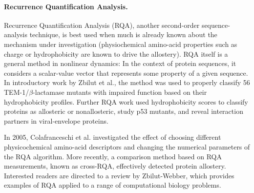 \paragraph{Recurrence Quantification Analysis.} Recurrence Quantification Analysis (RQA), another second-order sequence-analysis technique, is best used when much is already known about the mechanism under investigation (\eg physiochemical amino-acid properties such as charge or hydrophobicity are known to drive the allostery). RQA itself is a general method in nonlinear dynamics\cite{Eckmann1987a}: In the context of protein sequences, it considers a scalar-value vector that represents some property of a given sequence. In introductory work by Zbilut et al.,\cite{Zbilut1998a} the method was used to properly classify 56 TEM-1/\(\beta\)-lactamase mutants with impaired function based on their hydrophobicity profiles. Further RQA work used hydrophobicity scores to classify proteins as allosteric or nonallosteric,\cite{Namboodiri2010a} study p53 mutants,\cite{Porrello2004a} and reveal interaction partners in viral-envelope proteins.\cite{Giuliani2002a}
\par In 2005, Colafranceschi et al. investigated the effect of choosing different physicochemical amino-acid descriptors and changing the numerical parameters of the RQA algorithm.\cite{Colafranceschia} More recently, a comparison method based on RQA measurements, known as cross-RQA, effectively detected protein allostery.\cite{Namboodiri2012} Interested readers are directed to a review by Zbilut-Webber, which provides examples of RQA applied to a range of computational biology problems.\cite{Zbilut2002a}
